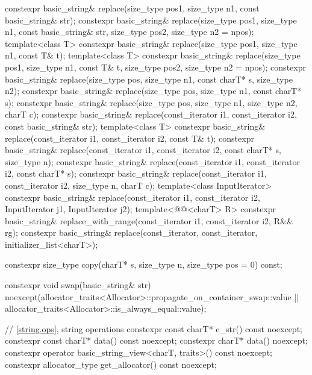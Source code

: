 \begin{codeblock}
{{    constexpr basic_string& replace(size_type pos1, size_type n1, const basic_string& str);
    constexpr basic_string& replace(size_type pos1, size_type n1, const basic_string& str,
                                    size_type pos2, size_type n2 = npos);
    template<class T>
      constexpr basic_string& replace(size_type pos1, size_type n1, const T& t);
    template<class T>
      constexpr basic_string& replace(size_type pos1, size_type n1, const T& t,
                                      size_type pos2, size_type n2 = npos);
    constexpr basic_string& replace(size_type pos, size_type n1, const charT* s, size_type n2);
    constexpr basic_string& replace(size_type pos, size_type n1, const charT* s);
    constexpr basic_string& replace(size_type pos, size_type n1, size_type n2, charT c);
    constexpr basic_string& replace(const_iterator i1, const_iterator i2,
                                    const basic_string& str);
    template<class T>
      constexpr basic_string& replace(const_iterator i1, const_iterator i2, const T& t);
    constexpr basic_string& replace(const_iterator i1, const_iterator i2, const charT* s,
                                    size_type n);
    constexpr basic_string& replace(const_iterator i1, const_iterator i2, const charT* s);
    constexpr basic_string& replace(const_iterator i1, const_iterator i2, size_type n, charT c);
    template<class InputIterator>
      constexpr basic_string& replace(const_iterator i1, const_iterator i2,
                                      InputIterator j1, InputIterator j2);
    template<@@<charT> R>
      constexpr basic_string& replace_with_range(const_iterator i1, const_iterator i2, R&& rg);
    constexpr basic_string& replace(const_iterator, const_iterator, initializer_list<charT>);

    constexpr size_type copy(charT* s, size_type n, size_type pos = 0) const;

    constexpr void swap(basic_string& str)
      noexcept(allocator_traits<Allocator>::propagate_on_container_swap::value ||
               allocator_traits<Allocator>::is_always_equal::value);

    // \ref{string.ops}, string operations
    constexpr const charT* c_str() const noexcept;
    constexpr const charT* data() const noexcept;
    constexpr charT* data() noexcept;
    constexpr operator basic_string_view<charT, traits>() const noexcept;
    constexpr allocator_type get_allocator() const noexcept;

}}
\end{codeblock}
